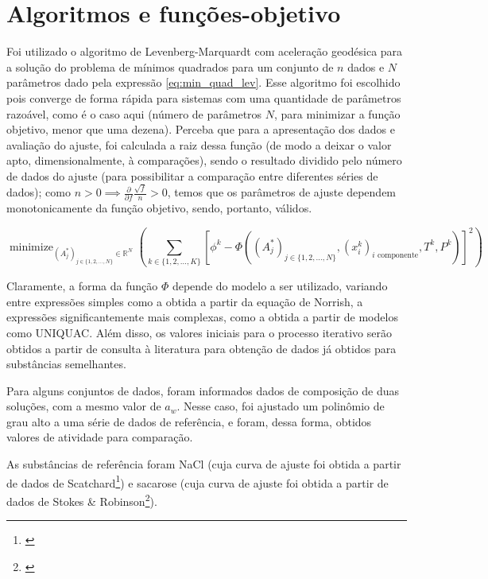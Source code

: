 \documentclass[
	12pt,				%
	openright,
	twoside,
	a4paper,			%
	english,			%
	french,				%
	spanish,			%
	brazil				%
	]{abntex2}
\DeclareMathOperator*{\minimize}{minimize}
\begin{document}
\chapter{Algoritmos e funções-objetivo}

Foi utilizado o algoritmo de Levenberg-Marquardt com aceleração geodésica para a
solução do problema de mínimos quadrados para um conjunto de $n$ dados e $N$
parâmetros dado pela expressão \ref{eq:min_quad_lev}.
Esse algoritmo foi escolhido pois converge de forma rápida para sistemas com
uma quantidade de parâmetros razoável, como é o caso aqui (número de parâmetros
$N$, para minimizar a função objetivo, menor que uma dezena).
Perceba que para a apresentação dos dados e avaliação do ajuste, foi calculada a
raiz dessa função (de modo a deixar o valor apto, dimensionalmente, à comparações),
sendo o resultado dividido pelo número de dados do ajuste (para possibilitar a
comparação entre diferentes séries de dados); como
$n>0 \implies \frac{\partial}{\partial f}\frac{\sqrt{f}}{n} >0$, temos que os
parâmetros de ajuste dependem monotonicamente da função objetivo, sendo, portanto,
válidos.

\begin{equation}
	\label{eq:min_quad_lev}
	\minimize_{(A_j^*)_{j \in \{1,2,\ldots,N\}} \in \mathbb{R}^N}%
	\left(\sum_{k \in \{1,2,\ldots,K\}}\left[\phi^k - \Phi((A^*_j)_{j%
	\in \{1, 2, \ldots, N\}}, (x^k_i)_\text{$i$ componente},%
	T^k, P^k)\right]^2\right)
\end{equation}

Claramente, a forma da função $\Phi$ depende do modelo a ser utilizado, variando
entre expressões simples como a obtida a partir da equação de Norrish, a
expressões significantemente mais complexas, como a obtida a partir de modelos
como UNIQUAC. Além disso, os valores iniciais para o processo iterativo serão
obtidos a partir de consulta à literatura para obtenção de dados já obtidos para
substâncias semelhantes.

Para alguns conjuntos de dados, foram informados dados de composição de duas
soluções, com a mesmo valor de $a_w$. Nesse caso, foi ajustado um polinômio
de grau alto a uma série de dados de referência, e foram, dessa forma, obtidos
valores de atividade para comparação.

As substâncias de referência foram NaCl (cuja curva de ajuste foi obtida a
partir de dados de Scatchard\footnote{\cite{scatchard1938}}) e sacarose (cuja
curva de ajuste foi obtida a partir de dados de Stokes \& Robinson\footnote{%
\cite{stokes1961}}).
\end{document}

